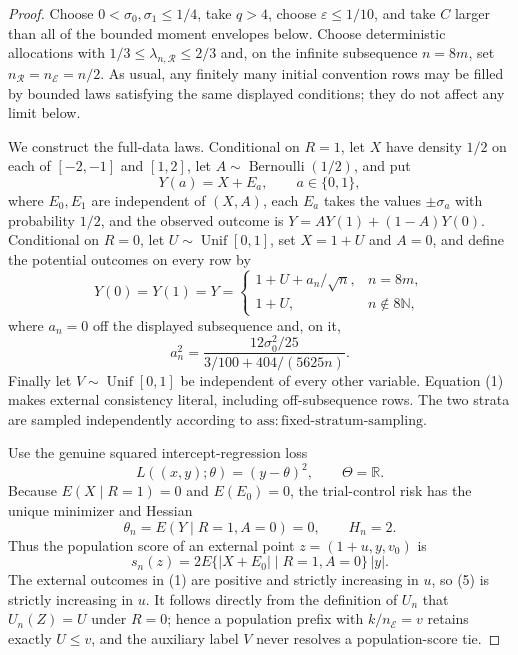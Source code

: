 \documentclass{article}
\begin{document}
\begin{proof}
Choose \(0<\sigma _0,\sigma _1\leq 1/4\), take \(q>4\), choose \(\varepsilon\leq 1/10\), and take \(C\) larger than all of the bounded moment envelopes below.  Choose deterministic allocations with \(1/3\leq\lambda_{n,\mathcal R}\leq2/3\) and, on the infinite subsequence \(n=8m\), set \(n_{\mathcal R}=n_{\mathcal E}=n/2\).  As usual, any finitely many initial convention rows may be filled by bounded laws satisfying the same displayed conditions; they do not affect any limit below.

We construct the full-data laws.  Conditional on \(R=1\), let \(X\) have density \(1/2\) on each of \([-2,-1]\) and \([1,2]\), let \(A\sim\operatorname{Bernoulli}(1/2)\), and put
\[
 Y(a)=X+E_a,\qquad a\in\{0,1\},
\]
where \(E_0,E_1\) are independent of \((X,A)\), each \(E_a\) takes the values \(\pm\sigma_a\) with probability \(1/2\), and the observed outcome is \(Y=AY(1)+(1-A)Y(0)\).  Conditional on \(R=0\), let \(U\sim\operatorname{Unif}[0,1]\), set \(X=1+U\) and \(A=0\), and define the potential outcomes on every row by
\[
 Y(0)=Y(1)=Y=
 \begin{cases}
  1+U+a_n/\sqrt n,&n=8m,\\
  1+U,&n\notin8\mathbb N,
 \end{cases}
 \tag{1}
\]
where \(a_n=0\) off the displayed subsequence and, on it,
\[
 a_n^2=
 \frac{12\sigma_0^2/25}{3/100+404/(5625n)}.
 \tag{2}
\]
Finally let \(V\sim\operatorname{Unif}[0,1]\) be independent of every other variable.  Equation (1) makes external consistency literal, including off-subsequence rows.  The two strata are sampled independently according to \(\mathrm{ass:fixed\text{-}stratum\text{-}sampling}\).

Use the genuine squared intercept-regression loss
\[
 L((x,y);\theta)=(y-\theta)^2,
 \qquad \Theta=\mathbb R.
 \tag{3}
\]
Because \(E(X\mid R=1)=0\) and \(E(E_0)=0\), the trial-control risk has the unique minimizer and Hessian
\[
 \theta_n=E(Y\mid R=1,A=0)=0,
 \qquad H_n=2.
 \tag{4}
\]
Thus the population score of an external point \(z=(1+u,y,v_0)\) is
\[
 s_n(z)
 =2E\{|X+E_0|\mid R=1,A=0\}\,|y|.
 \tag{5}
\]
The external outcomes in (1) are positive and strictly increasing in \(u\), so (5) is strictly increasing in \(u\).  It follows directly from the definition of \(U_n\) that \(U_n(Z)=U\) under \(R=0\); hence a population prefix with \(k/n_{\mathcal E}=v\) retains exactly \(U\leq v\), and the auxiliary label \(V\) never resolves a population-score tie.


\end{proof}
\end{document}
